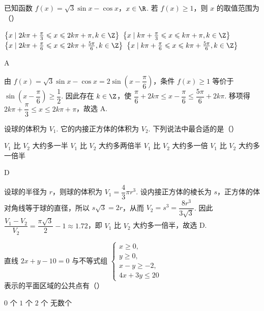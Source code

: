 \begin{problem}
已知函数 \(f(x) = \sqrt{3}\sin x - \cos x\)，\(x \in \R\). 若 \( f(x) \geqslant 1 \)，则 \( x \) 的取值范围为（\quad）

\choices
    {\(\left\{x\mid 2k\pi +\frac{\pi}{3}\leqslant x\leqslant 2k\pi +\pi ,k\in \Z\right\}\)}
    {\(\left\{x\mid k\pi +\frac{\pi}{3}\leqslant x\leqslant k\pi +\pi,k\in \Z\right\}\)}
    {\(\left\{x\mid 2k\pi +\frac{\pi}{6}\leqslant x\leqslant 2k\pi +\frac{5\pi}{6},k\in \Z\right\}\)}
    {\(\left\{x\mid k\pi +\frac{\pi}{6}\leqslant x\leqslant k\pi +\frac{5\pi}{6},k\in \Z\right\}\)}
\end{problem}

\begin{answer}
A
\end{answer}

\begin{solution}
由
\(f(x)=\sqrt{3}\sin x-\cos x=2\sin\left(x-\dfrac{\pi}{6}\right)\)，条件 \(f(x)\geqslant1\) 等价于
\(\sin\left(x-\dfrac{\pi}{6}\right)\geqslant\dfrac12\). 因此存在 \(k\in\Z\)，使
\(\dfrac{\pi}{6}+2k\pi\leqslant x-\dfrac{\pi}{6}\leqslant\dfrac{5\pi}{6}+2k\pi\). 移项得
\(2k\pi+\dfrac{\pi}{3}\leqslant x\leqslant2k\pi+\pi\)，故选 A.
\end{solution}

\begin{problem}
设球的体积为 \(V_{1}\). 它的内接正方体的体积为 \(V_{2}\). 下列说法中最合适的是（\quad）

\choices
    {\(V_{1}\) 比 \(V_{2}\) 大约多一半}
    {\(V_{1}\) 比 \(V_{2}\) 大约多两倍半}
    {\(V_{1}\) 比 \(V_{2}\) 大约多一倍}
    {\(V_{1}\) 比 \(V_{2}\) 大约多一倍半}
\end{problem}

\begin{answer}
D
\end{answer}

\begin{solution}
设球的半径为 \(r\)，则球的体积为 \(V_1=\dfrac43\pi r^3\). 设内接正方体的棱长为 \(s\)，正方体的体对角线等于球的直径，所以 \(s\sqrt{3}=2r\)，从而
\(V_2=s^3=\dfrac{8r^3}{3\sqrt{3}}\). 因此
\(\dfrac{V_1-V_2}{V_2}=\dfrac{\pi\sqrt{3}}{2}-1\approx1.72\)，即 \(V_1\) 比 \(V_2\) 大约多一倍半，故选 D.
\end{solution}

\begin{problem}
直线 \(2x + y - 10 = 0\) 与不等式组 \(\begin{cases}
x \geqslant 0,\\
y \geqslant 0,\\
x - y \geqslant -2,\\
4x + 3y \leqslant 20
\end{cases}\) 表示的平面区域的公共点有（\quad）

\choices
    {\(0\text{ 个}\)}
    {\(1\text{ 个}\)}
    {\(2\text{ 个}\)}
    {无数个}
\end{problem}

